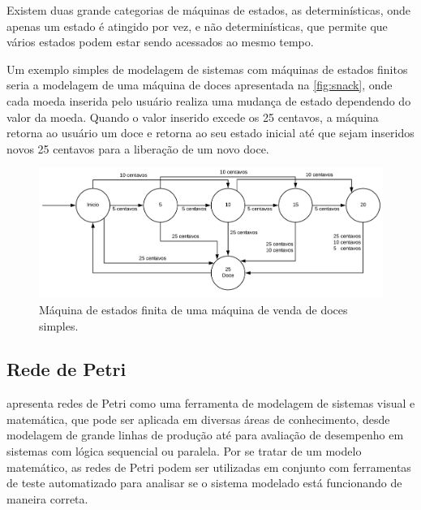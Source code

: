 Existem duas grande categorias de máquinas de estados, as determinísticas, onde apenas um estado é atingido por vez, e não determinísticas, que permite que vários estados podem estar sendo acessados ao mesmo tempo. \cite{hopcroft:2001}

Um exemplo simples de modelagem de sistemas com máquinas de estados finitos seria a modelagem de uma máquina de doces apresentada na \autoref{fig:snack}, onde cada moeda inserida pelo usuário realiza uma mudança de estado dependendo do valor da moeda. Quando o valor inserido excede os 25 centavos, a máquina retorna ao usuário um doce e retorna ao seu estado inicial até que sejam inseridos novos 25 centavos para a liberação de um novo doce.

\begin{figure}[ht]
    \centering
    \includegraphics[width=\textwidth, keepaspectratio]{resources/fsm.pdf}
    \caption{Máquina de estados finita de uma máquina de venda de doces simples.}
    \label{fig:snack}
\end{figure}

 \newpage





\subsection{Rede de Petri}
\label{def:petri_prop}
 apresenta redes de Petri como uma ferramenta de modelagem de sistemas visual e matemática, que pode ser aplicada em diversas áreas de conhecimento, desde modelagem de grande linhas de produção até para avaliação de desempenho em sistemas com lógica sequencial ou paralela. Por se tratar de um modelo matemático, as redes de Petri podem ser utilizadas em conjunto com ferramentas de teste automatizado para analisar se o sistema modelado está funcionando de maneira correta.


